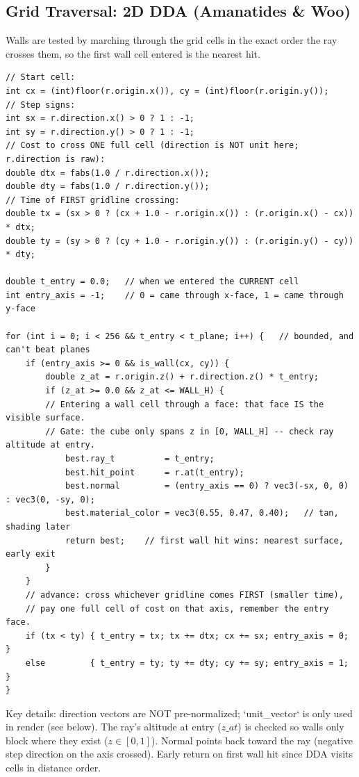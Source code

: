 \subsection{Grid Traversal: 2D DDA (Amanatides \& Woo)}
Walls are tested by marching through the grid cells in the exact order the ray crosses them, so the first wall cell entered is the nearest hit.
\begin{verbatim}
// Start cell:
int cx = (int)floor(r.origin.x()), cy = (int)floor(r.origin.y());
// Step signs:
int sx = r.direction.x() > 0 ? 1 : -1;
int sy = r.direction.y() > 0 ? 1 : -1;
// Cost to cross ONE full cell (direction is NOT unit here; r.direction is raw):
double dtx = fabs(1.0 / r.direction.x());
double dty = fabs(1.0 / r.direction.y());
// Time of FIRST gridline crossing:
double tx = (sx > 0 ? (cx + 1.0 - r.origin.x()) : (r.origin.x() - cx)) * dtx;
double ty = (sy > 0 ? (cy + 1.0 - r.origin.y()) : (r.origin.y() - cy)) * dty;

double t_entry = 0.0;   // when we entered the CURRENT cell
int entry_axis = -1;    // 0 = came through x-face, 1 = came through y-face

for (int i = 0; i < 256 && t_entry < t_plane; i++) {   // bounded, and can't beat planes
    if (entry_axis >= 0 && is_wall(cx, cy)) {
        double z_at = r.origin.z() + r.direction.z() * t_entry;
        if (z_at >= 0.0 && z_at <= WALL_H) {
        // Entering a wall cell through a face: that face IS the visible surface.
        // Gate: the cube only spans z in [0, WALL_H] -- check ray altitude at entry.
            best.ray_t          = t_entry;
            best.hit_point      = r.at(t_entry);
            best.normal         = (entry_axis == 0) ? vec3(-sx, 0, 0) : vec3(0, -sy, 0);
            best.material_color = vec3(0.55, 0.47, 0.40);   // tan, shading later
            return best;    // first wall hit wins: nearest surface, early exit
        }
    }
    // advance: cross whichever gridline comes FIRST (smaller time),
    // pay one full cell of cost on that axis, remember the entry face.
    if (tx < ty) { t_entry = tx; tx += dtx; cx += sx; entry_axis = 0; }
    else         { t_entry = ty; ty += dty; cy += sy; entry_axis = 1; }
}
\end{verbatim}
Key details: direction vectors are NOT pre-normalized; `unit_vector` is only used in render (see below). The ray's altitude at entry ($z\_at$) is checked so walls only block where they exist ($z \in [0, 1]$). Normal points back toward the ray (negative step direction on the axis crossed). Early return on first wall hit since DDA visits cells in distance order.


